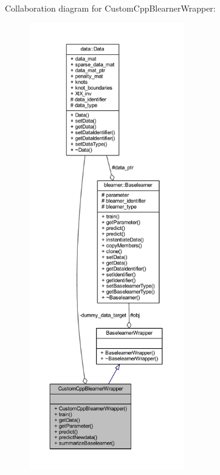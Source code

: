 Collaboration diagram for Custom\+Cpp\+Blearner\+Wrapper\+:
\nopagebreak
\begin{figure}[H]
\begin{center}
\leavevmode
\includegraphics[height=550pt]{class_custom_cpp_blearner_wrapper__coll__graph}
\end{center}
\end{figure}
